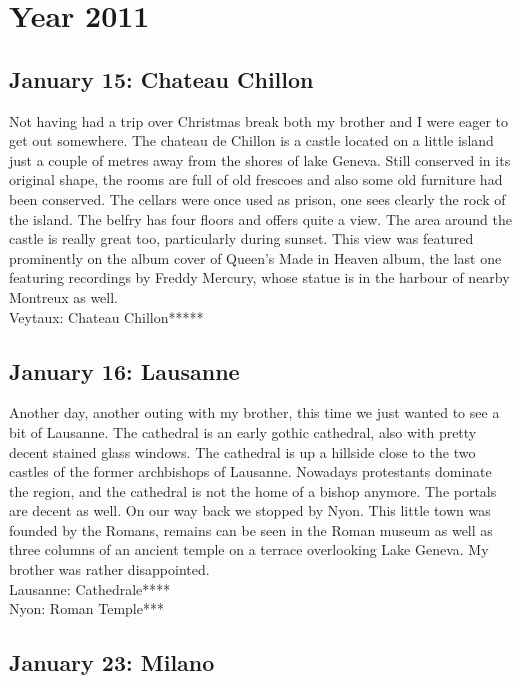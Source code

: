 \chapter{Year 2011}
\label{2011}

\section{January 15: Chateau Chillon}
\label{2011:Chillon}

Not having had a trip over Christmas break both my brother and I were eager to get out somewhere. The chateau de Chillon is a castle located on a little island just a couple of metres away from the shores of lake Geneva. Still conserved in its original shape, the rooms are full of old frescoes and also some old furniture had been conserved. The cellars were once used as prison, one sees clearly the rock of the island. The belfry has four floors and offers quite a view. The area around the castle is really great too, particularly during sunset. This view was featured prominently on the album cover of Queen's Made in Heaven album, the last one featuring recordings by Freddy Mercury, whose statue is in the harbour of nearby Montreux as well.\\

Veytaux: Chateau Chillon*****

\section{January 16: Lausanne}
\label{Lausanne2011}

Another day, another outing with my brother, this time we just wanted to see a bit of Lausanne. The cathedral is an early gothic cathedral, also with pretty decent stained glass windows. The cathedral is up a hillside close to the two castles of the former archbishops of Lausanne. Nowadays protestants dominate the region, and the cathedral is not the home of a bishop anymore. The portals are decent as well. On our way back we stopped by Nyon. This little town was founded by the Romans, remains can be seen in the Roman museum as well as three columns of an ancient temple on a terrace overlooking Lake Geneva. My brother was rather disappointed.\\

Lausanne: Cathedrale****\\
Nyon: Roman Temple***

\section{January 23: Milano}
\label{Milano2011}

